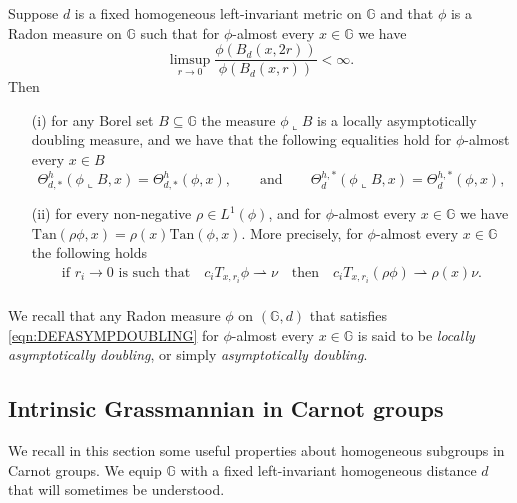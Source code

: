 \documentclass[10pt, a4paper,
oneside, headinclude,footinclude]{scrartcl}
\begin{document}
\begin{proposizione}\label{prop:Lebesuge}
Suppose $d$ is a fixed homogeneous left-invariant metric on $\mathbb{G}$ and that $\phi$ is a Radon measure on $\mathbb{G}$ such that for $\phi$-almost every $x\in \mathbb{G}$ we have
\begin{equation}\label{eqn:DEFASYMPDOUBLING}
\limsup_{r\to 0}\frac{\phi(B_d(x,2r))}{\phi(B_d(x,r))}<\infty.
\end{equation}
Then
\begin{itemize}
    \item[(i)]for any Borel set $B\subseteq \mathbb{G}$ the measure $\phi\llcorner B$ is a locally asymptotically doubling measure, and we have that the following equalities hold for $\phi$-almost every $x\in B$
$$\Theta^h_{d,*}(\phi\llcorner B,x)=\Theta^h_{d,*}(\phi,x),\qquad \text{and}\qquad\Theta^{h,*}_d(\phi\llcorner B,x)=\Theta^{h,*}_d(\phi,x),$$
\item[(ii)] for every non-negative $\rho\in L^1(\phi)$, and for $\phi$-almost every $x\in\mathbb{G}$ we have
$\mathrm{Tan}(\rho\phi,x)=\rho(x)\mathrm{Tan}(\phi,x)$. More precisely, for $\phi$-almost every $x\in\mathbb G$ the following holds
\begin{equation}
    \begin{split}
        \text{if $r_i\to 0$ is such that}\quad c_iT_{x,r_i}\phi \rightharpoonup \nu\quad \text{then}\quad c_iT_{x,r_i}(\rho\phi)\rightharpoonup \rho(x)\nu.  \\
    \end{split}
\end{equation}
\end{itemize}
\end{proposizione}
We recall that any Radon measure $\phi$ on $(\mathbb G,d)$ that satisfies \eqref{eqn:DEFASYMPDOUBLING} for $\phi$-almost every $x\in\mathbb G$ is said to be {\em locally asymptotically doubling}, or simply {\em asymptotically doubling}.








\subsection{Intrinsic Grassmannian in Carnot groups}

We recall in this section some useful properties about homogeneous subgroups in Carnot groups. We equip $\mathbb G$ with a fixed left-invariant homogeneous distance $d$ that will sometimes be understood.
\end{document}
